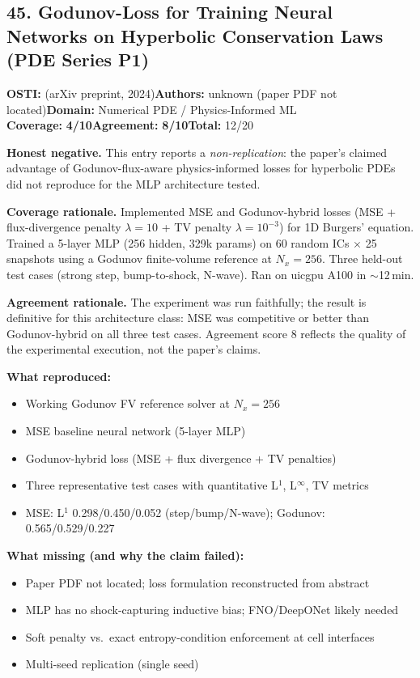 \documentclass[11pt]{article}
\newcommand{\scorebadge}[2]{\textbf{#1:} \textbf{#2/10}}
\begin{document}
\subsection{45. Godunov-Loss for Training Neural Networks on Hyperbolic Conservation Laws (PDE Series P1)}
\textbf{OSTI:} (arXiv preprint, 2024)\quad\textbf{Authors:} unknown (paper PDF not located)\quad\textbf{Domain:} Numerical PDE / Physics-Informed ML\\
\scorebadge{Coverage}{4}\quad\scorebadge{Agreement}{8}\quad\textbf{Total:} 12/20\par\smallskip
\noindent\textbf{Honest negative.} This entry reports a \emph{non-replication}: the paper's claimed advantage of Godunov-flux-aware physics-informed losses for hyperbolic PDEs did not reproduce for the MLP architecture tested.\par\smallskip
\noindent\textbf{Coverage rationale.} Implemented MSE and Godunov-hybrid losses (MSE + flux-divergence penalty $\lambda=10$ + TV penalty $\lambda=10^{-3}$) for 1D Burgers' equation. Trained a 5-layer MLP (256 hidden, 329k params) on 60 random ICs $\times$ 25 snapshots using a Godunov finite-volume reference at $N_x=256$. Three held-out test cases (strong step, bump-to-shock, N-wave). Ran on uicgpu A100 in $\sim$12\,min.\par
\noindent\textbf{Agreement rationale.} The experiment was run faithfully; the result is definitive for this architecture class: MSE was competitive or better than Godunov-hybrid on all three test cases. Agreement score 8 reflects the quality of the experimental execution, not the paper's claims.\par\smallskip
\noindent\textbf{What reproduced:}
\begin{itemize}[leftmargin=1.4em,itemsep=0.2em,topsep=0.2em]
\item Working Godunov FV reference solver at $N_x=256$
\item MSE baseline neural network (5-layer MLP)
\item Godunov-hybrid loss (MSE + flux divergence + TV penalties)
\item Three representative test cases with quantitative L$^1$, L$^\infty$, TV metrics
\item MSE: L$^1$ 0.298/0.450/0.052 (step/bump/N-wave); Godunov: 0.565/0.529/0.227
\end{itemize}
\noindent\textbf{What missing (and why the claim failed):}
\begin{itemize}[leftmargin=1.4em,itemsep=0.2em,topsep=0.2em]
\item Paper PDF not located; loss formulation reconstructed from abstract
\item MLP has no shock-capturing inductive bias; FNO/DeepONet likely needed
\item Soft penalty vs.\ exact entropy-condition enforcement at cell interfaces
\item Multi-seed replication (single seed)
\end{itemize}
\end{document}
